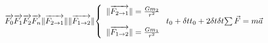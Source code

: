 \documentclass{article}
\begin{document}
\begin{math}
$$\overrightarrow{F_{0}}$$
\\
\\
$$\overrightarrow{F_{1}}$$
\\
\\
$$\overrightarrow{F_{2}}$$
\\
\\
$$\overrightarrow{F_{n}}$$
\\
\\
\|\overrightarrow{F_{2\to1}}\|
\\
\\
\|\overrightarrow{F_{1\to2}}\|
\\
\\
$$
\left\lbrace
\begin{array}{l}
\|\overrightarrow{F_{2\to1}}\|=\frac{Gm_{2}}{r^{2}}
\\
\\
\|\overrightarrow{F_{1\to2}}\|=\frac{Gm_{1}}{r^{2}}
\end{array}
\right.
\\
\\
$$
t_{0}+\delta t
\\
\\
t_{0}+2\delta t
\\
\\
\delta t
\\
\\
$$\sum{\vec{F}}=m\vec{a}$$
\end{math}
\end{document}
